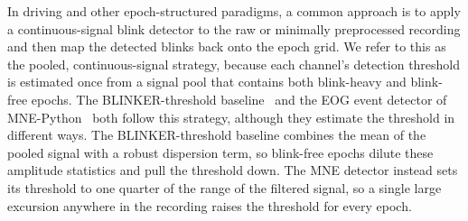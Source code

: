 In driving and other epoch-structured paradigms, a common approach is to apply a continuous-signal blink detector to the raw or minimally preprocessed recording and then map the detected blinks back onto the epoch grid. We refer to this as the pooled, continuous-signal strategy, because each channel's detection threshold is estimated once from a signal pool that contains both blink-heavy and blink-free epochs. The BLINKER-threshold baseline~\citep{kleifges2017blinker} and the EOG event detector of MNE-Python~\citep{GramfortEtAl2013a} both follow this strategy, although they estimate the threshold in different ways.
The BLINKER-threshold baseline combines the mean of the pooled signal with a robust dispersion term, so blink-free epochs dilute these amplitude statistics and pull the threshold down. The MNE detector instead sets its threshold to one quarter of the range of the filtered signal, so a single large excursion anywhere in the recording raises the threshold for every epoch. %
